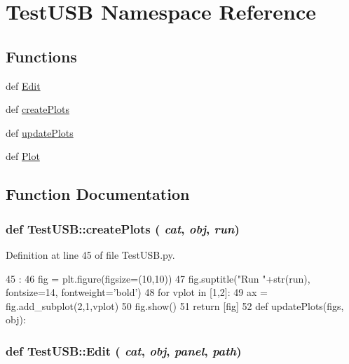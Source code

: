\hypertarget{namespaceTestUSB}{
\section{TestUSB Namespace Reference}
\label{namespaceTestUSB}
}
\subsection*{Functions}
\begin{DoxyCompactItemize}
\item 
def \hyperlink{namespaceTestUSB_aa754fe9c69716d79c8b234607ae89b9e}{Edit}
\item 
def \hyperlink{namespaceTestUSB_ac5dfad60b265b2657e058fbac7f65062}{createPlots}
\item 
def \hyperlink{namespaceTestUSB_ac6a13f8454d9fcbe9c3391f1d758d5f0}{updatePlots}
\item 
def \hyperlink{namespaceTestUSB_ac2da13ae016cb78599ea9e921006ae59}{Plot}
\end{DoxyCompactItemize}


\subsection{Function Documentation}
\hypertarget{namespaceTestUSB_ac5dfad60b265b2657e058fbac7f65062}{
\subsubsection[{createPlots}]{\setlength{\rightskip}{0pt plus 5cm}def TestUSB::createPlots ( {\em cat}, \/   {\em obj}, \/   {\em run})}}
\label{namespaceTestUSB_ac5dfad60b265b2657e058fbac7f65062}


Definition at line 45 of file TestUSB.py.


\begin{DoxyCode}
45                               :
46     fig = plt.figure(figsize=(10,10))
47     fig.suptitle("Run "+str(run), fontsize=14, fontweight='bold')
48     for vplot in [1,2]:
49         ax = fig.add_subplot(2,1,vplot)
50     fig.show()    
51     return [fig]
52 
def updatePlots(figs, obj):
\end{DoxyCode}
\hypertarget{namespaceTestUSB_aa754fe9c69716d79c8b234607ae89b9e}{
\subsubsection[{Edit}]{\setlength{\rightskip}{0pt plus 5cm}def TestUSB::Edit ( {\em cat}, \/   {\em obj}, \/   {\em panel}, \/   {\em path})}}
\label{namespaceTestUSB_aa754fe9c69716d79c8b234607ae89b9e}


